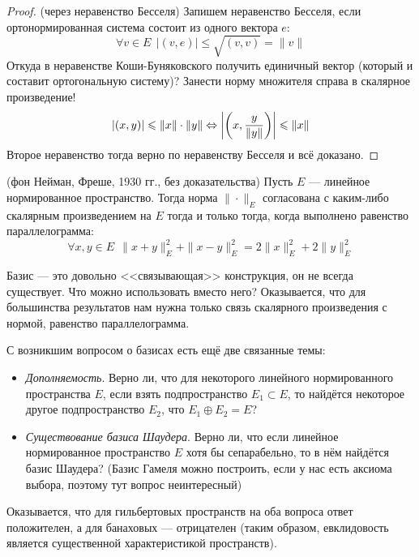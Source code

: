 \begin{proof} (через неравенство Бесселя)
	Запишем неравенство Бесселя, если ортонормированная система состоит из одного вектора $e$:
	\[
		\forall v \in E\ \ |(v, e)| \le \sqrt{(v, v)} = \|v\|
	\]
	Откуда в неравенстве Коши-Буняковского получить единичный вектор (который и составит ортогональную систему)? Занести норму множителя справа в скалярное произведение!
	\[
		|(x, y)| \leqslant \|x\| \cdot \|y\| \Leftrightarrow \left|\left(x, \frac{y}{\|y\|}\right)\right| \leqslant \|x\|
	\]
	Второе неравенство тогда верно по неравенству Бесселя и всё доказано.
\end{proof}

\begin{theorem} (фон Нейман, Фреше, 1930 гг., без доказательства)
	Пусть $E$ --- линейное нормированное пространство. Тогда норма $\|\cdot\|_E$ согласована с каким-либо скалярным произведением на $E$ тогда и только тогда, когда выполнено равенство параллелограмма:
	\[
		\forall x, y \in E\ \ \|x + y\|_E^2 + \|x - y\|_E^2 = 2\|x\|_E^2 + 2\|y\|_E^2
	\]
\end{theorem}

\begin{note}
	Базис --- это довольно <<связывающая>> конструкция, он не всегда существует. Что можно использовать вместо него? Оказывается, что для большинства результатов нам нужна только связь скалярного произведения с нормой, равенство параллелограмма.
\end{note}

\begin{note}
	С возникшим вопросом о базисах есть ещё две связанные темы:
	\begin{itemize}
		\item \textit{Дополняемость}. Верно ли, что для некоторого линейного нормированного пространства $E$, если взять подпространство $E_1 \subset E$, то найдётся некоторое другое подпространство $E_2$, что $E_1 \oplus E_2 = E$?
		
		\item \textit{Существование базиса Шаудера}. Верно ли, что если линейное нормированное пространство $E$ хотя бы сепарабельно, то в нём найдётся базис Шаудера? (Базис Гамеля можно построить, если у нас есть аксиома выбора, поэтому тут вопрос неинтересный)
	\end{itemize}
	Оказывается, что для гильбертовых пространств на оба вопроса ответ положителен, а для банаховых --- отрицателен (таким образом, евклидовость является существенной характеристикой пространств).
\end{note}

